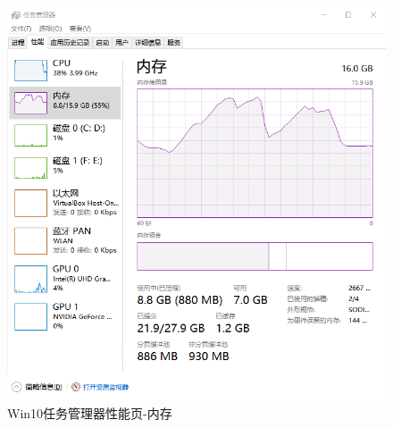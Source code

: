\documentclass{beamer}
\begin{document}
\begin{frame}
    
\begin{figure}
    \centering
    \includegraphics[scale=0.4]{../media/comparison/win10 perfTab mem.png}
    \caption{Win10任务管理器性能页-内存}
    \label{fig:win10mem}
\end{figure}
\end{frame}
\end{document}
